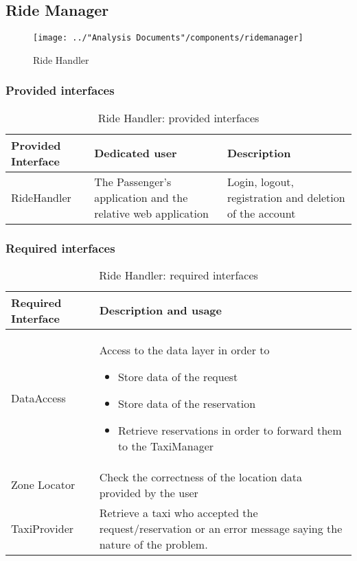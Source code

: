\subsection{Ride Manager}\label{comp:rideManager}
\begin{figure}[H]
	\centering
	\texttt{[image: ../"Analysis Documents"/components/ridemanager]}
	\label{fig:rideHandler}
	\caption{Ride Handler}
\end{figure}
\subsubsection{Provided interfaces}
\begin{table}[H]
\begin{longtable}{| p{} | p{} | p{} |}
\hline
 \textbf{Provided Interface} & \textbf{Dedicated user} & \textbf{Description} \\ \hline
RideHandler & The Passenger's application and the relative web application & Login, logout, registration and deletion of the account \\ \hline
\end{longtable}
\caption{Ride Handler: provided interfaces}
\label{tab:rideHandler:providedInterfaces}
\end{table}
\subsubsection{Required interfaces}
\begin{table}[H]
\begin{longtable}{| l | p{} |}
\hline
 \textbf{Required Interface} & \textbf{Description and usage} \\ \hline
DataAccess & Access to the data layer in order to 
			\begin{itemize}
				\item Store data of the request
				\item Store data of the reservation
				\item Retrieve reservations in order to forward them to the TaxiManager
			\end{itemize} \\ \hline
Zone Locator & Check the correctness of the location data provided by the user \\ \hline
TaxiProvider & Retrieve a taxi who accepted the request/reservation or an error message saying the nature of the problem. \\ \hline
\end{longtable}
\caption{Ride Handler: required interfaces}
\label{tab:rideHandler:requiredInterfaces}
\end{table}
